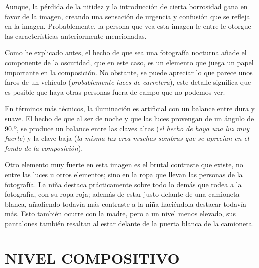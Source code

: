 \documentclass[11pt]{article}
\begin{document}
Aunque, la pérdida de la nitidez y la introducción de cierta borrosidad gana en favor de la imagen, creando una sensación de urgencia y confusión que se refleja en la imagen. Probablemente, la persona que vea esta imagen le entre le otorgue las características anteriormente mencionadas.  \newline

Como he explicado antes, el hecho de que sea una fotografía nocturna añade el componente de la oscuridad, que en este caso, es un elemento que juega un papel importante en la composición. No obstante, se puede apreciar lo que parece unos faros de un vehículo (\textit{probablemente luces de carretera}), este detalle significa que es posible que haya otras personas fuera de campo que no podemos ver. \newline

En términos más técnicos, la iluminación es artificial con un balance entre dura y suave. El hecho de que al ser de noche y que las luces provengan de un ángulo de 90.º, se produce un balance entre las claves altas (\textit{el hecho de haya una luz muy fuerte}) y la clave baja (\textit{la misma luz crea muchas sombras que se aprecian en el fondo de la composición}). \newline

Otro elemento muy fuerte en esta imagen es el brutal contraste que existe, no entre las luces u otros elementos; sino en la ropa que llevan las personas de la fotografía. La niña destaca prácticamente sobre todo lo demás que rodea a la fotografía, con su ropa roja; además de estar justo delante de una camioneta blanca, añadiendo todavía más contraste a la niña haciéndola destacar todavía más. Esto también ocurre con la madre, pero a un nivel menos elevado, sus pantalones también resaltan al estar delante de la puerta blanca de la camioneta. \newline

\section{NIVEL COMPOSITIVO}
\end{document}
